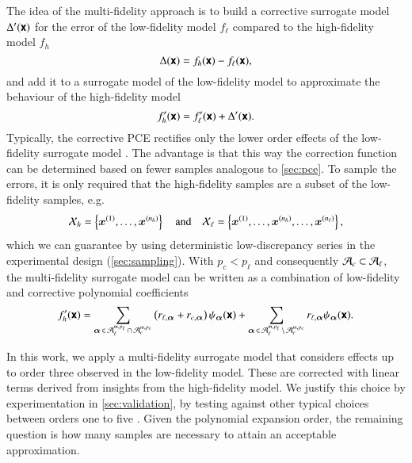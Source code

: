 
The idea of the multi-fidelity approach is to build a corrective surrogate model $\Delta'(\boldsymbol{\mathsf{x}})$ for the
error of the low-fidelity model $f_\ell$ compared to the high-fidelity model $f_h$ 
\begin{equation}
    \Delta(\boldsymbol{\mathsf{x}}) = f_h(\boldsymbol{\mathsf{x}}) - f_\ell(\boldsymbol{\mathsf{x}}),
\end{equation}
and add it to a surrogate model of the low-fidelity model to approximate the behaviour of the
high-fidelity model
\begin{equation}
    f_h'(\boldsymbol{\mathsf{x}}) = f_\ell'(\boldsymbol{\mathsf{x}}) + \Delta'(\boldsymbol{\mathsf{x}}).
\end{equation}
Typically, the corrective PCE rectifies only the lower order effects
of the low-fidelity surrogate model \cite{palar_multi-fidelity_2016}.
The advantage is that this way the correction function can be determined
based on fewer samples analogous to \cref{sec:pce}.
To sample the errors, it is only required that the
high-fidelity samples are a subset of the low-fidelity samples, e.g.
\begin{equation}
    \mathcal{X}_h = \left\{ \bm{x}^{(1)}, \dots, \bm{x}^{(n_h)}\right\} \quad\text{and}\quad
    \mathcal{X}_\ell = \left\{ \bm{x}^{(1)}, \dots, \bm{x}^{(n_h)}, \dots, \bm{x}^{(n_\ell)}\right\},
\end{equation}
which we can guarantee by using deterministic low-discrepancy series
in the experimental design (\cref{sec:sampling}).
With $p_c < p_\ell$ and consequently $\mathcal{A}_c \subset \mathcal{A}_\ell$,
the multi-fidelity surrogate model can be written as a combination of low-fidelity
and corrective polynomial coefficients
\begin{equation}
    f_h' (\boldsymbol{\mathsf{x}}) = \sum_{{\bm{\alpha}}\,\in\,\mathcal{A}_\ell^{m,p_\ell} \,\cap\, \mathcal{A}_c^{m,p_c}}
    \left(
     r_{\ell,{\bm{\alpha}}} + r_{c,{\bm{\alpha}}}
    \right) \psi_{\bm{\alpha}}(\boldsymbol{\mathsf{x}}) + 
    \sum_{{\bm{\alpha}}\,\in\,\mathcal{A}_\ell^{m,p_\ell} \,\setminus\, \mathcal{A}_c^{m,p_c}}
    r_{\ell,{\bm{\alpha}}} \psi_{\bm{\alpha}}(\boldsymbol{\mathsf{x}}).
\end{equation}


In this work, we apply a multi-fidelity surrogate model that considers
effects up to order three observed in the low-fidelity model. These are corrected with linear terms derived from insights from the high-fidelity model.
We justify this choice by experimentation in \cref{sec:validation},
by testing against other typical choices between orders one to five \cite{gratiet_metamodel-based_2015}.
Given the polynomial expansion order, the remaining question is how many samples are necessary to attain an acceptable approximation.

